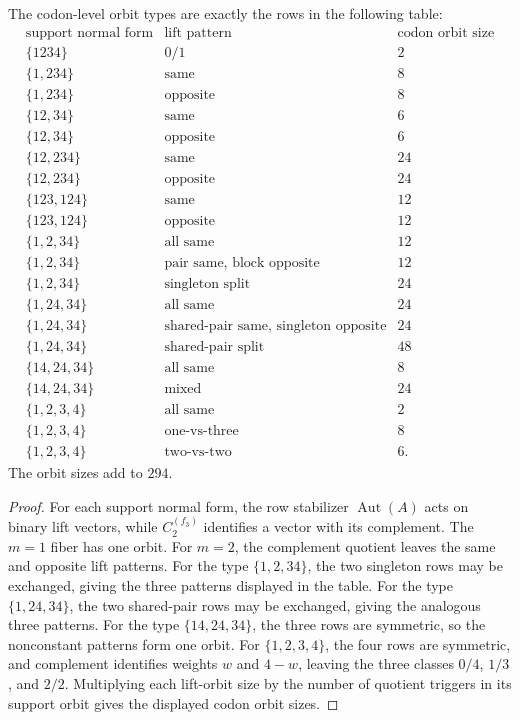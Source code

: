 \begin{theorem}
\label{thm:philosophy-codon-level-lift-orbit-table}
The codon-level orbit types are exactly the rows in the following table:
$$
\begin{array}{c|c|r}
  \text{support normal form} & \text{lift pattern} & \text{codon orbit size}\\
  \hline
  \{1234\} & 0/1 & 2\\
  \{1,234\} & \text{same} & 8\\
  \{1,234\} & \text{opposite} & 8\\
  \{12,34\} & \text{same} & 6\\
  \{12,34\} & \text{opposite} & 6\\
  \{12,234\} & \text{same} & 24\\
  \{12,234\} & \text{opposite} & 24\\
  \{123,124\} & \text{same} & 12\\
  \{123,124\} & \text{opposite} & 12\\
  \{1,2,34\} & \text{all same} & 12\\
  \{1,2,34\} & \text{pair same, block opposite} & 12\\
  \{1,2,34\} & \text{singleton split} & 24\\
  \{1,24,34\} & \text{all same} & 24\\
  \{1,24,34\} & \text{shared-pair same, singleton opposite} & 24\\
  \{1,24,34\} & \text{shared-pair split} & 48\\
  \{14,24,34\} & \text{all same} & 8\\
  \{14,24,34\} & \text{mixed} & 24\\
  \{1,2,3,4\} & \text{all same} & 2\\
  \{1,2,3,4\} & \text{one-vs-three} & 8\\
  \{1,2,3,4\} & \text{two-vs-two} & 6.
\end{array}
$$
The orbit sizes add to $294$.
\end{theorem}
\begin{proof}
For each support normal form, the row stabilizer
$\operatorname{Aut}(A)$ acts on binary lift vectors, while
$C_{2}^{(f_{3})}$ identifies a vector with its complement. The $m=1$
fiber has one orbit. For $m=2$, the complement quotient leaves the same
and opposite lift patterns. For the type $\{1,2,34\}$, the two
singleton rows may be exchanged, giving the three patterns displayed in
the table. For the type $\{1,24,34\}$, the two shared-pair rows may be
exchanged, giving the analogous three patterns. For the type
$\{14,24,34\}$, the three rows are symmetric, so the nonconstant
patterns form one orbit. For $\{1,2,3,4\}$, the four rows are symmetric,
and complement identifies weights $w$ and $4-w$, leaving the three
classes $0/4$, $1/3$, and $2/2$. Multiplying each lift-orbit size by the
number of quotient triggers in its support orbit gives the displayed
codon orbit sizes.
\end{proof}


